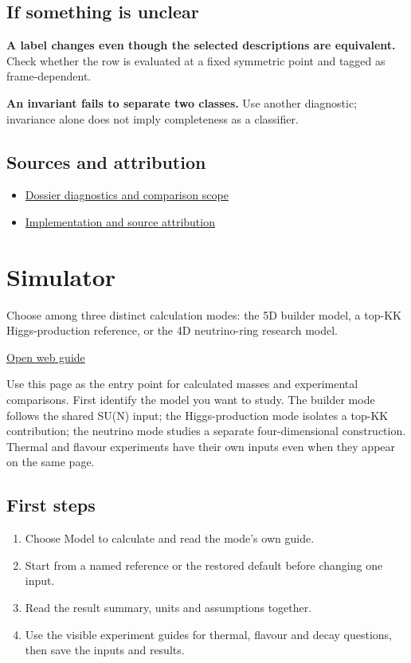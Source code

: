 \documentclass[11pt,a4paper]{article}
\begin{document}
\subsection*{If something is unclear}
\textbf{A label changes even though the selected descriptions are equivalent.} Check whether the row is evaluated at a fixed symmetric point and tagged as frame-dependent.

\textbf{An invariant fails to separate two classes.} Use another diagnostic; invariance alone does not imply completeness as a classifier.

\subsection*{Sources and attribution}
\begin{itemize}
\item \href{https://github.com/karlesmarin/ghu-lab/blob/main/src/modules/dossier.mjs}{Dossier diagnostics and comparison scope}
\item \href{https://github.com/karlesmarin/ghu-lab/blob/main/src/sections/dossier_section.js}{Implementation and source attribution}
\end{itemize}
\section{Simulator}
Choose among three distinct calculation modes: the 5D builder model, a top-KK Higgs-production reference, or the 4D neutrino-ring research model.

\href{https://karlesmarin.github.io/ghu-explorer/guide/predict/index.html}{Open web guide}

Use this page as the entry point for calculated masses and experimental comparisons. First identify the model you want to study. The builder mode follows the shared SU(N) input; the Higgs-production mode isolates a top-KK contribution; the neutrino mode studies a separate four-dimensional construction. Thermal and flavour experiments have their own inputs even when they appear on the same page.
\subsection*{First steps}
\begin{enumerate}
\item Choose Model to calculate and read the mode's own guide.
\item Start from a named reference or the restored default before changing one input.
\item Read the result summary, units and assumptions together.
\item Use the visible experiment guides for thermal, flavour and decay questions, then save the inputs and results.
\end{enumerate}
\end{document}
